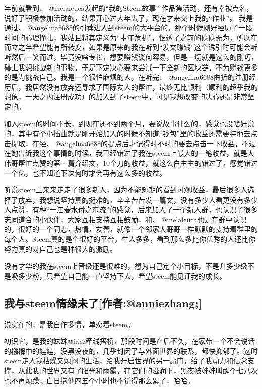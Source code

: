 \documentclass[]{ctexbook}
\begin{document}
年前就看到、 @melaleuca发起的``我的Steem故事'' 作品集活动，还有幸被点名，说好了积极参加活动的，结果开心过大年去了，现在才来交上我的``作业''。
我是通过、 @angelina6688的引荐进入到steem的大平台的，那个时候刚好经历了一段时间的心理挣扎，我姑且将其定义为``中年危机''，恨透了之前的碌碌无为，所以在而立之年希望能有所转变，如果是原来的我在听到``发文赚钱''这个诱引时可能会听听然后一笑而过，毕竟没啥专长，想要赚钱谈何容易，但是一切就是这么的刚巧，碰上我想挑战新的事物，于是下定决心要来尝试一下全新的区块链，不为赚钱更多的是为挑战自己。我是一个很怕麻烦的人，在听完、 @angelina6688曲折的注册经历后，我居然没有放弃还寻求了国际友人的帮忙，最终无比顺利（顺利的超乎我的想象，一天之内注册成功）的加入到了steem中，可见我想改变的决心还是非常坚定的。

加入steem的时间不长，到现在还不到两个月，要说故事什么的，感觉也没啥好说的，其中有个小插曲就是刚开始加入的时候不知道``钱包''里的收益还需要特地去点击提取，在经、 @angelina6688的提点后才记得时不时的要去点击一下收益，不过在她告诉我这个事情的时候，我已经错过了我在steem上最大的一笔收益，就是大伟哥帮忙点赞的第一篇介绍文，10个刀的收益，就这么白生生的错过了，感觉错过一个亿，也不知道下次何时才会再有这么多的收益。

听说steem上来来走走了很多新人，因为不能短期的看到可观收益，最后很多人选择了放弃，我想说坚持真的挺难的，辛辛苦苦发一篇文，没有多少人看更没有多少人点赞，有种``一江春水付之东流''的感觉，后来加入了一个新人群，也认识了很多志同道合的小伙伴，大家互相支持互相鼓励，和、 @melaleuca也是在群中认识的，很好的一个同志，热情，友善，就像一个邻家大哥哥一样默默的支持着群里的每个人。Steem真的是个很好的平台，牛人多多，看到那么多比你优秀的人还比你努力真的对自己也是种很大的激励。

没有才华的我在steem上晋级还是很难的，想为自己定个小目标，不是升多少级不是吸多少粉，只希望自己能一直坚持下去，希望steem能见证我的成长。

\hypertarget{steemanniezhang}{%
\subsection{我与steem情缘未了{[}作者:@anniezhang;{]}}\label{steemanniezhang}}

说实在的，是我自作多情，单恋着steem。

初识它，是我的妹妹@irisz牵线搭桥，那段时间是产后不久，在家带一个不会说话的襁褓中的娃娃，没黑没夜的，几乎封闭了与外面世界的联系，都快抑郁了。这时steem走入我枯燥又烦闷的生活，给我开启世界的另一扇门，给了我动力和信念支撑，从此我的世界又有了阳光和雨露，在它们的滋润下，黑夜被娃娃叫醒个七八次也不再烦躁，白日抱他四五个小时也不觉得那么累了，哈哈。
\end{document}
